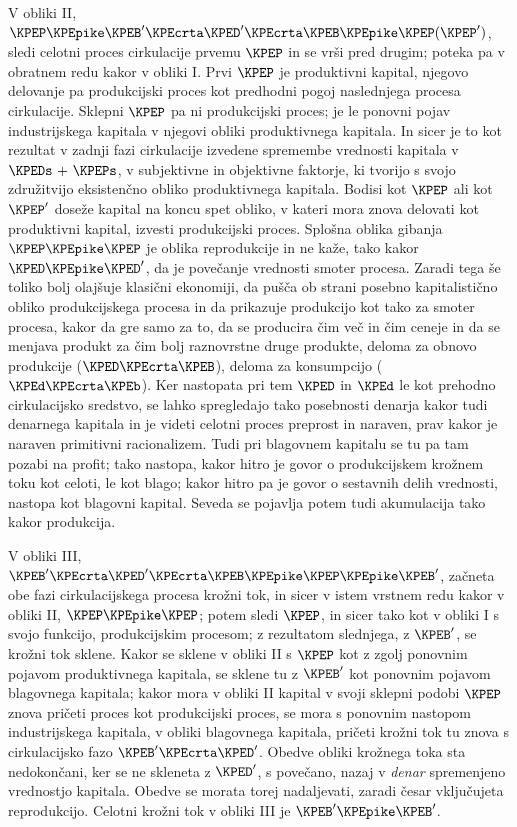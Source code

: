 \documentclass[kapital_02.tex]{subfiles}
\begin{document}
V obliki II, \( \KPEP \KPEpike \KPEB' \KPEcrta \KPED' \KPEcrta \KPEB \KPEpike \KPEP ( \KPEP' ) \), sledi celotni proces cirkulacije prvemu \( \KPEP \) in se vrši pred drugim; poteka pa v obratnem redu kakor v obliki I. Prvi \( \KPEP \) je produktivni kapital, njegovo delovanje pa produkcijski proces kot predhodni pogoj naslednjega procesa cirkulacije. Sklepni \( \KPEP \) pa ni produkcijski proces; je le ponovni pojav industrijskega kapitala v njegovi obliki produktivnega kapitala. In sicer je to kot rezultat v zadnji fazi cirkulacije izvedene spremembe vrednosti kapitala v \( \KPEDs \textrm{ + } \KPEPs \), v subjektivne in objektivne faktorje, ki tvorijo s svojo združitvijo eksistenčno obliko produktivnega kapitala. Bodisi kot \( \KPEP \) ali kot \( \KPEP' \) doseže kapital na koncu spet obliko, v kateri mora znova delovati kot produktivni kapital, izvesti produkcijski proces. Splošna oblika gibanja \( \KPEP \KPEpike \KPEP \) je oblika reprodukcije in ne kaže, tako kakor \( \KPED \KPEpike \KPED' \), da je povečanje vrednosti smoter procesa. Zaradi tega še toliko bolj olajšuje klasični ekonomiji, da pušča ob strani posebno kapitalistično obliko produkcijskega procesa in da prikazuje produkcijo kot tako za smoter procesa, kakor da gre samo za to, da se producira čim več in čim ceneje in da se menjava produkt za čim bolj raznovrstne druge produkte, deloma za obnovo produkcije (\( \KPED \KPEcrta \KPEB \)), deloma za konsumpcijo (\( \KPEd \KPEcrta \KPEb \)). Ker nastopata pri tem \( \KPED \) in \( \KPEd \) le kot prehodno cirkulacijsko sredstvo, se lahko spregledajo tako posebnosti denarja kakor tudi denarnega kapitala in je videti celotni proces \KPEstran preprost in naraven, prav kakor je naraven primitivni racionalizem. Tudi pri blagovnem kapitalu se tu pa tam pozabi na profit; tako nastopa, kakor hitro je govor o produkcijskem krožnem toku kot celoti, le kot blago; kakor hitro pa je govor o sestavnih delih vrednosti, nastopa kot blagovni kapital. Seveda se pojavlja potem tudi akumulacija tako kakor produkcija.

V obliki III, \( \KPEB' \KPEcrta \KPED' \KPEcrta \KPEB \KPEpike \KPEP \KPEpike \KPEB' \), začneta obe fazi cirkulacijskega procesa krožni tok, in sicer v istem vrstnem redu kakor v obliki II, \( \KPEP \KPEpike \KPEP \); potem sledi \( \KPEP \), in sicer tako kot v obliki I s svojo funkcijo, produkcijskim procesom; z rezultatom slednjega, z \( \KPEB' \), se krožni tok sklene. Kakor se sklene v obliki II s \( \KPEP \) kot z zgolj ponovnim pojavom produktivnega kapitala, se sklene tu z \( \KPEB' \) kot ponovnim pojavom blagovnega kapitala; kakor mora v obliki II kapital v svoji sklepni podobi \( \KPEP \) znova pričeti proces kot produkcijski proces, se mora s ponovnim nastopom industrijskega kapitala, v obliki blagovnega kapitala, pričeti krožni tok tu znova s cirkulacijsko fazo \( \KPEB' \KPEcrta \KPED' \). Obedve obliki krožnega toka sta nedokončani, ker se ne skleneta z \( \KPED' \), s povečano, nazaj v \emph{denar} spremenjeno vrednostjo kapitala. Obedve se morata torej nadaljevati, zaradi česar vključujeta reprodukcijo. Celotni krožni tok v obliki III je \( \KPEB' \KPEpike \KPEB' \).
\end{document}

